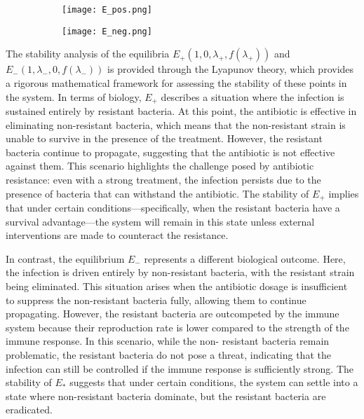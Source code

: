 \begin{figure}
    \centering
    \caption{Equilibria of $E_+$ and $E_-$}
    \begin{subfigure}{0.45\textwidth}
        \centering
        \texttt{[image: E\_pos.png]}
        \label{fig:epos}
    \end{subfigure}
    \begin{subfigure}{0.45\textwidth}
        \centering
        \label{fig:eneg}
        \texttt{[image: E\_neg.png]}
    \end{subfigure}
\end{figure}

The stability analysis of the equilibria $E_+ \left(1, 0, \lambda_+ , f(\lambda_+)\right)$ and $E_- \left(1, \lambda_- , 0, f(\lambda_-)\right)$ is provided through the Lyapunov theory, which provides a rigorous mathematical framework for assessing the stability of these points in the system. In terms of biology, $E_+$ describes a situation where the infection is sustained entirely by resistant bacteria. At this point, the antibiotic is effective in eliminating non-resistant bacteria, which means that the non-resistant strain is unable to survive in the presence of the treatment. However, the resistant bacteria continue to propagate, suggesting that the antibiotic is not effective against them. This scenario highlights the challenge posed by antibiotic resistance: even with a strong treatment, the infection persists due to the presence of bacteria that can withstand the antibiotic. The stability of $E_+$ implies that under certain conditions—specifically, when the resistant bacteria have a survival advantage—the system will remain in this state unless external interventions are made to counteract the resistance.


In contrast, the equilibrium $E_-$ represents a different biological outcome. Here, the infection is driven entirely by non-resistant bacteria, with the resistant strain being eliminated. This situation arises when the antibiotic dosage is insufficient to suppress the non-resistant bacteria fully, allowing them to continue propagating. However, the resistant bacteria are outcompeted by the immune system because their reproduction rate is lower compared to the strength of the immune response. In this scenario, while the non- resistant bacteria remain problematic, the resistant bacteria do not pose a threat, indicating that the infection can still be controlled if the immune response is sufficiently strong. The stability of $E_*$ suggests that under certain conditions, the system can settle into a state where non-resistant bacteria dominate, but the resistant bacteria are eradicated.

